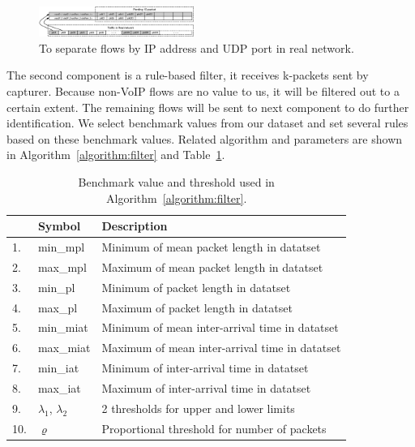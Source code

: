 \documentclass[conference]{IEEEtran}
\begin{document}
\begin{figure}[htp]
\begin{center}
\includegraphics[width=0.45\textwidth]{flow.eps}
\caption{To separate flows by IP address and UDP port in real network.}\label{fig:flow}
\end{center}
\end{figure}

The second component is a rule-based filter, it receives k-packets sent by capturer. Because non-VoIP flows are no value to us, it will be filtered out to a certain extent. The remaining flows will be sent to next component to do further identification. We select benchmark values from our dataset and set several rules based on these benchmark values. Related algorithm and parameters are shown in Algorithm~\ref{algorithm:filter} and Table~\ref{tab:rules}.

\begin{table}[htbp]
  \caption{Benchmark value and threshold used in Algorithm~\ref{algorithm:filter}.}
  \label{tab:rules}
  \centering
  \begin{tabular}{l l l}
    \hline
    \textbf{} & \textbf{Symbol} & \textbf{Description}\\
    \hline
    1. & min\_mpl      &   Minimum of mean packet length in datatset\\
    2. & max\_mpl      &  Maximum of mean packet length in datatset\\
    3. & min\_pl      &   Minimum of packet length in datatset\\
    4. & max\_pl      &   Maximum of packet length in datatset\\
    5. & min\_miat      &   Minimum of mean inter-arrival time in datatset\\
    6. & max\_miat      &   Maximum of mean inter-arrival time in datatset\\
    7. & min\_iat      &   Minimum of inter-arrival time in datatset\\
    8. & max\_iat      &  Maximum of inter-arrival time in datatset\\
    9. & ${\lambda_1}$, ${\lambda_2}$      &  2 thresholds for upper and lower limits \\
    10. & ${\varrho}$    &   Proportional threshold for number of packets\\
    \hline
  \end{tabular}
\end{table}
\end{document}
